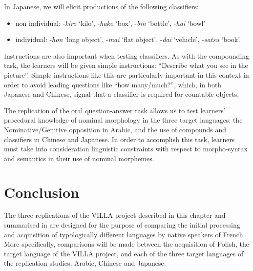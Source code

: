 \documentclass[output=paper,colorlinks,citecolor=brown,modfonts,nonflat]{../langscibook}
\begin{document}
In Japanese, we will elicit productions of the following classifiers:

\begin{itemize}

  \item  non individual: -\textit{kiro} `kilo', -\textit{hako} `box', -\textit{bin} `bottle', -\textit{hai} `bowl'

  \item  individual: -\textit{hon} `long object', -\textit{mai} `flat object', -\textit{dai} `vehicle', -\textit{satsu} `book'.
\end{itemize}

Instructions are also important when testing classifiers. As with the compounding task, the learners will be given simple instructions: “Describe what you see in the picture”. Simple instructions like this are particularly important in this context in order to avoid leading questions like “how many/much?”, which, in both Japanese and Chinese, signal that a classifier is required for countable objects. 

The replication of the oral question-answer task allows us to test learners' procedural knowledge of nominal morphology in the three target languages: the Nominative/Genitive opposition in Arabic, and the use of compounds and classifiers in Chinese and Japanese. In order to accomplish this task, learners must take into consideration linguistic constraints with respect to morpho-syntax and semantics in their use of nominal morphemes. 

\section{Conclusion}\label{sec:watorek:5}

The three replications of the VILLA project described in this chapter and summarised in  are designed for the purpose of comparing the initial processing and acquisition of typologically different languages by native speakers of French. More specifically, comparisons will be made between the acquisition of Polish, the target language of the VILLA project, and each of the three target languages of the replication studies, Arabic, Chinese and Japanese.
\end{document}
